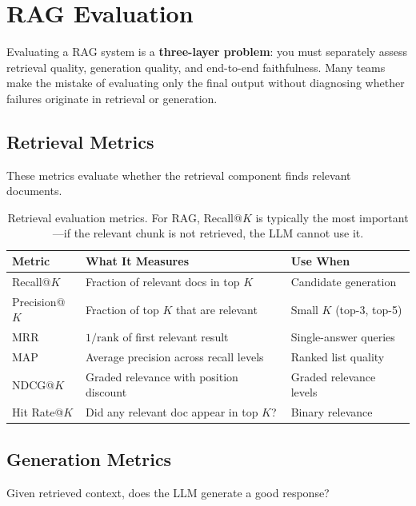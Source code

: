 \section{RAG Evaluation}
\label{sec:rag-evaluation}

Evaluating a RAG system is a \textbf{three-layer problem}: you must separately
assess retrieval quality, generation quality, and end-to-end faithfulness.
Many teams make the mistake of evaluating only the final output without
diagnosing whether failures originate in retrieval or generation.

\subsection{Retrieval Metrics}

These metrics evaluate whether the retrieval component finds relevant documents.

\begin{table}[H]
\centering
\small
\begin{tabularx}{\textwidth}{@{}l X l@{}}
\toprule
\textbf{Metric} & \textbf{What It Measures} & \textbf{Use When} \\
\midrule
Recall@$K$ & Fraction of relevant docs in top $K$ & Candidate generation \\
Precision@$K$ & Fraction of top $K$ that are relevant & Small $K$ (top-3, top-5) \\
MRR & $1/\text{rank}$ of first relevant result & Single-answer queries \\
MAP & Average precision across recall levels & Ranked list quality \\
NDCG@$K$ & Graded relevance with position discount & Graded relevance levels \\
Hit Rate@$K$ & Did any relevant doc appear in top $K$? & Binary relevance \\
\bottomrule
\end{tabularx}
\caption{Retrieval evaluation metrics.  For RAG, Recall@$K$ is typically the
most important---if the relevant chunk is not retrieved, the LLM cannot use it.}
\label{tab:retrieval-metrics}
\end{table}

\subsection{Generation Metrics}

Given retrieved context, does the LLM generate a good response?

